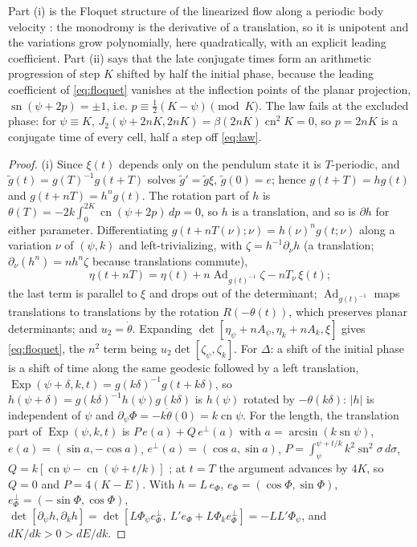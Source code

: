 \documentclass[11pt]{article}
\theoremstyle{remark}
\newcommand{\sn}{\operatorname{sn}}
\newcommand{\cn}{\operatorname{cn}}
\begin{document}
Part (i) is the Floquet structure of the linearized flow along a periodic
body velocity \cite[Chapter~III]{Hale1980}: the monodromy is the derivative
of a translation, so it is unipotent and the variations grow
polynomially, here quadratically, with an explicit leading coefficient.
Part (ii) says that the late conjugate times form an arithmetic
progression of step $K$ shifted by half the initial phase, because the
leading coefficient of \eqref{eq:floquet} vanishes at the inflection points
of the planar projection, $\sn(\psi+2p)=\pm1$, i.e.
$p\equiv\tfrac12(K-\psi)\pmod K$.  The law fails at the excluded phase:
for $\psi\equiv K$, $J_2(\psi+2nK,2nK)=\beta(2nK)\cn^2K=0$, so $p=2nK$ is a
conjugate time of every cell, half a step off \eqref{eq:law}.

\begin{proof}
(i) Since $\xi(t)$ depends only on the pendulum state it is $T$-periodic,
and $\tilde g(t)=g(T)^{-1}g(t+T)$ solves $\tilde g'=\tilde g\xi$,
$\tilde g(0)=e$; hence $g(t+T)=hg(t)$ and $g(t+nT)=h^ng(t)$.  The rotation
part of $h$ is $\theta(T)=-2k\int_0^{2K}\cn(\psi+2p)\,dp=0$, so $h$ is a
translation, and so is $\partial h$ for either parameter.  Differentiating
$g(t+nT(\nu);\nu)=h(\nu)^ng(t;\nu)$ along a
variation $\nu$ of $(\psi,k)$ and left-trivializing, with
$\zeta=h^{-1}\partial_\nu h$ (a translation; $\partial_\nu(h^n)=nh^n\zeta$
because translations commute),
\[
 \eta(t+nT)=\eta(t)+n\operatorname{Ad}_{g(t)^{-1}}\zeta-nT_\nu\,\xi(t);
\]
the last term is parallel to $\xi$ and drops out of the determinant;
$\operatorname{Ad}_{g(t)^{-1}}$ maps translations to translations by the
rotation $R(-\theta(t))$, which preserves planar determinants; and
$u_2=\dot\theta$.  Expanding $\det[\eta_\psi+nA_\psi,\eta_k+nA_k,\xi]$ gives
\eqref{eq:floquet}, the $n^2$ term being $u_2\det[\zeta_\psi,\zeta_k]$.
For $\Delta$: a shift of the initial phase is a shift of time along the
same geodesic followed by a left translation,
$\operatorname{Exp}(\psi+\delta,k,t)=g(k\delta)^{-1}g(t+k\delta)$, so
$h(\psi+\delta)=g(k\delta)^{-1}h(\psi)g(k\delta)$ is $h(\psi)$ rotated by
$-\theta(k\delta)$: $|h|$ is independent of $\psi$ and
$\partial_\psi\Phi=-k\dot\theta(0)=k\cn\psi$.  For the length, the
translation part of $\operatorname{Exp}(\psi,k,t)$ is
$P\,e(a)+Q\,e^\perp(a)$ with $a=\arcsin(k\sn\psi)$, $e(a)=(\sin a,-\cos a)$,
$e^\perp(a)=(\cos a,\sin a)$, $P=\int_\psi^{\psi+t/k}k^2\sn^2\sigma\,d\sigma$,
$Q=k[\cn\psi-\cn(\psi+t/k)]$ \cite[\S3.3]{MoiseevSachkov2010Maxwell}; at
$t=T$ the argument advances by $4K$, so $Q=0$ and $P=4(K-E)$.  With
$h=L\,e_\Phi$, $e_\Phi=(\cos\Phi,\sin\Phi)$, $e_\Phi^\perp=(-\sin\Phi,\cos\Phi)$,
$\det[\partial_\psi h,\partial_kh]=\det[L\Phi_\psi e_\Phi^\perp,\ L'e_\Phi+L\Phi_ke_\Phi^\perp]=-LL'\Phi_\psi$,
and $dK/dk>0>dE/dk$.


\end{proof}
\end{document}
